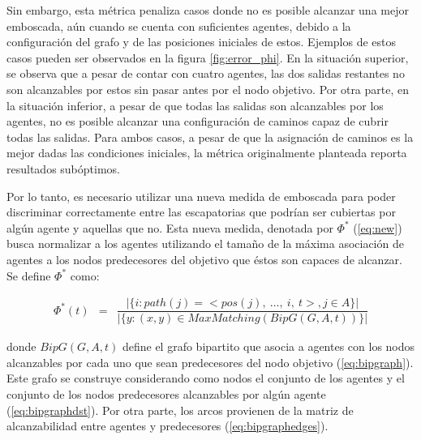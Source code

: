 

Sin embargo, esta m\'etrica penaliza casos donde no es posible alcanzar
una mejor emboscada, a\'un cuando se cuenta con suficientes agentes, debido
a la configuraci\'on del grafo y de las posiciones iniciales de estos. 
Ejemplos de estos casos pueden ser observados en la figura \ref{fig:error_phi}. En
la situaci\'on superior, se observa que a pesar de contar con cuatro agentes,
las dos salidas restantes no son alcanzables por estos sin pasar antes por el
nodo objetivo. Por otra parte, en la situaci\'on inferior, a pesar de que todas
las salidas son alcanzables por los agentes, no es posible alcanzar una
configuraci\'on de caminos capaz de cubrir todas las salidas. Para ambos
casos, a pesar de que la asignaci\'on de caminos es la mejor dadas las
condiciones iniciales, la m\'etrica originalmente planteada reporta resultados
sub\'optimos.



Por lo tanto, es necesario utilizar una nueva medida de emboscada
para poder discriminar correctamente entre las escapatorias que podr\'ian
ser cubiertas por alg\'un agente y aquellas que no. Esta nueva medida,
denotada por $\Phi^*$ (\ref{eq:new}) busca normalizar a los agentes utilizando
el tamaño de la m\'axima asociaci\'on de agentes a los nodos predecesores
del objetivo que \'estos son capaces de alcanzar. Se define $\Phi^*$ como:

\begin{small}
\begin{eqnarray}
 \Phi^*(t) &=& 
\dfrac{|\{ i : path(j) = <pos(j),\ \ldots,\ i,\ t>, j \in A\}|}
	  {|\{ y : (x,y) \in MaxMatching(BipG(G,A,t))\}|}
\label{eq:new}
\end{eqnarray}
\end{small}

\noindent
donde $BipG(G,A,t)$ define el grafo bipartito que asocia a agentes con
los nodos alcanzables por cada uno que sean predecesores del nodo objetivo
(\ref{eq:bipgraph}).
Este grafo se construye considerando como nodos el conjunto
de los agentes y el conjunto de los nodos predecesores alcanzables por alg\'un
agente (\ref{eq:bipgraphdst}). Por otra parte, los arcos provienen
de la matriz de alcanzabilidad entre agentes y predecesores (\ref{eq:bipgraphedges}).

